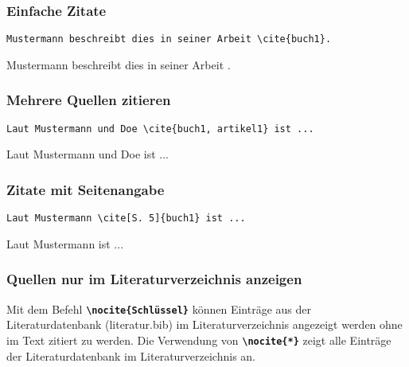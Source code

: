 \subsubsection{Einfache Zitate}

\begin{minipage}[c]{0.48\textwidth}
    \begin{lstlisting}[language={[LaTeX]TeX}]
Mustermann beschreibt dies in seiner Arbeit \cite{buch1}.
    \end{lstlisting}
\end{minipage}
\hfill
\begin{minipage}[c]{0.48\textwidth}
    Mustermann beschreibt dies in seiner Arbeit \cite{buch1}.
\end{minipage}


\subsubsection{Mehrere Quellen zitieren}

\begin{minipage}[c]{0.48\textwidth}
    \begin{lstlisting}[language={[LaTeX]TeX}]
Laut Mustermann und Doe \cite{buch1, artikel1} ist ...
    \end{lstlisting}
\end{minipage}
\hfill
\begin{minipage}[c]{0.48\textwidth}
    Laut Mustermann und Doe \cite{buch1, artikel1} ist ...
\end{minipage}


\subsubsection{Zitate mit Seitenangabe}

\begin{minipage}[c]{0.48\textwidth}
    \begin{lstlisting}[language={[LaTeX]TeX}]
Laut Mustermann \cite[S. 5]{buch1} ist ...
    \end{lstlisting}
\end{minipage}
\hfill
\begin{minipage}[c]{0.48\textwidth}
    Laut Mustermann \cite[S. 5]{buch1} ist ...
\end{minipage}


\subsubsection{Quellen nur im Literaturverzeichnis anzeigen}
Mit dem Befehl \textbf{\texttt{\textbackslash nocite\{Schlüssel\}}} können Einträge aus der Literaturdatenbank (literatur.bib) im Literaturverzeichnis angezeigt werden ohne im Text zitiert zu werden.
Die Verwendung von \textbf{\texttt{\textbackslash nocite\{*\}}} zeigt alle Einträge der Literaturdatenbank im Literaturverzeichnis an.



